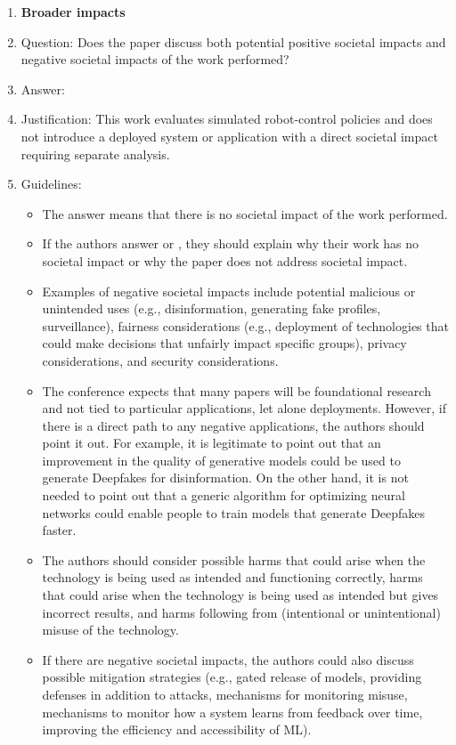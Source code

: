 \documentclass{article}
\begin{document}
\begin{enumerate}
\item {\bf Broader impacts}
    \item[] Question: Does the paper discuss both potential positive societal impacts and negative societal impacts of the work performed?
    \item[] Answer: \answerNA{}%
    \item[] Justification: This work evaluates simulated robot-control policies and does not introduce a deployed system or application with a direct societal impact requiring separate analysis.
    \item[] Guidelines:
    \begin{itemize}
        \item The answer \answerNA{} means that there is no societal impact of the work performed.
        \item If the authors answer \answerNA{} or \answerNo, they should explain why their work has no societal impact or why the paper does not address societal impact.
        \item Examples of negative societal impacts include potential malicious or unintended uses (e.g., disinformation, generating fake profiles, surveillance), fairness considerations (e.g., deployment of technologies that could make decisions that unfairly impact specific groups), privacy considerations, and security considerations.
        \item The conference expects that many papers will be foundational research and not tied to particular applications, let alone deployments. However, if there is a direct path to any negative applications, the authors should point it out. For example, it is legitimate to point out that an improvement in the quality of generative models could be used to generate Deepfakes for disinformation. On the other hand, it is not needed to point out that a generic algorithm for optimizing neural networks could enable people to train models that generate Deepfakes faster.
        \item The authors should consider possible harms that could arise when the technology is being used as intended and functioning correctly, harms that could arise when the technology is being used as intended but gives incorrect results, and harms following from (intentional or unintentional) misuse of the technology.
        \item If there are negative societal impacts, the authors could also discuss possible mitigation strategies (e.g., gated release of models, providing defenses in addition to attacks, mechanisms for monitoring misuse, mechanisms to monitor how a system learns from feedback over time, improving the efficiency and accessibility of ML).
    \end{itemize}



\end{enumerate}
\end{document}
